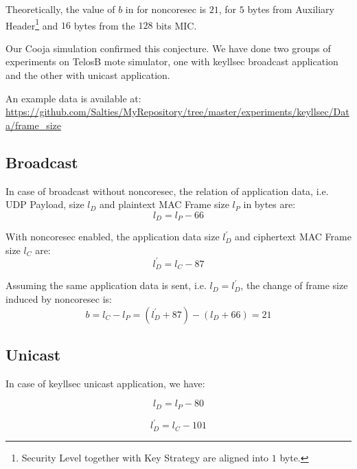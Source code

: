 Theoretically, the value of $b$ in  for noncoresec is $21$, for $5$ bytes from Auxiliary Header\footnote{Security Level together with Key Strategy are aligned into $1$ byte.} and $16$ bytes from the $128$ bits MIC.

Our Cooja simulation confirmed this conjecture. We have done two groups of experiments on TelosB mote simulator, one with keyllsec broadcast application and the other with unicast application.

An example data is available at: \\
\url{https://github.com/Salties/MyRepository/tree/master/experiments/keyllsec/Data/frame_size}

\subsection{Broadcast}
In case of broadcast without noncoresec, the relation of application data, i.e. UDP Payload, size $l_D$ and plaintext MAC Frame size $l_P$ in bytes are:
\begin{equation}
	l_D = l_{P} - 66
\end{equation}

With noncoresec enabled, the application data size $l^{\prime}_D$ and ciphertext MAC Frame size $l_C$ are:
\begin{equation} \label{Eq: broadcast llsec data size}
	l^{\prime}_D = l_{C} - 87
\end{equation}

Assuming the same application data is sent, i.e. $l_D = l^{\prime}_D$, the change of frame size induced by noncoresec is:
\begin{equation}
	b = l_C - l_P = (l^{\prime}_D + 87) - (l_D + 66) = 21
\end{equation}

\subsection{Unicast}

In case of keyllsec unicast application, we have:

\begin{equation}
	l_D= l_P - 80
\end{equation}

\begin{equation} \label{Eq: unicast llsec data size}
	l^{\prime}_D = l_{C} - 101 
\end{equation}

